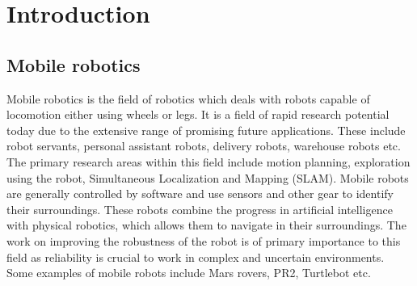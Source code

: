 \documentclass[12pt]{article}
\begin{document}
\newpage
\thispagestyle{empty}
\tableofcontents
\thispagestyle{empty}
\newpage
\thispagestyle{empty}
\listoffigures
\thispagestyle{empty}
\newpage
\thispagestyle{empty}
\listoftables
\thispagestyle{empty}
\newpage
\thispagestyle{empty}
\section{Introduction}
\label{sec:intro}
\vspace{-0.2in}
\subsection{Mobile robotics}
Mobile robotics is the field of robotics which deals with robots capable of locomotion either using wheels or legs. It is a field of rapid research potential today due to the extensive range of promising future applications. These include robot servants, personal assistant robots, delivery robots, warehouse robots etc. The primary research areas within this field include motion planning, exploration using the robot, Simultaneous Localization and Mapping (SLAM). Mobile robots are generally controlled by software and use sensors and other gear to identify their surroundings. These robots combine the progress in artificial intelligence with physical robotics, which allows them to navigate in their surroundings. The work on improving the robustness of the robot is of primary importance to this field as reliability is crucial to work in complex and uncertain environments. Some examples of mobile robots include Mars rovers, PR2, Turtlebot etc.
\end{document}
